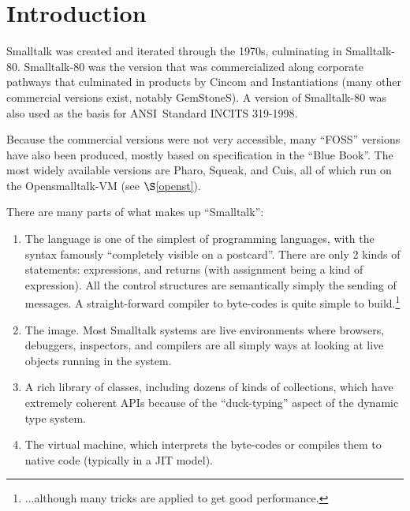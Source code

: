 \documentclass[
]{ceurart}
\def\secref{$\S$\ref}
\begin{document}
\section{Introduction}
Smalltalk was created and iterated through the 1970s\cite{10.1145/3386335}, culminating in Smalltalk-80\cite{Smalltalk-80,10.5555/226}.
Smalltalk-80 was the version that was commercialized along corporate pathways that culminated in products by Cincom\cite{Cincom-smalltalk} and Instantiations\cite{Instantiations-smalltalk} (many other commercial versions exist, notably GemStoneS\cite{Gemtalk-smalltalk}).
A version of Smalltalk-80 was also used as the basis for ANSI~Standard INCITS 319-1998\cite{ANSI-Smalltalk}.

Because the commercial versions were not very accessible, many ``FOSS'' versions have also been produced, mostly based on specification in the ``Blue Book''\cite{Smalltalk-80}.
The most widely available versions are Pharo\cite{Pharo-Smalltalk}, Squeak\cite{Squeak-Smalltalk}, and Cuis\cite{Cuis-Smalltalk}, all of which run on the Opensmalltalk-VM (see \secref{openst}).

There are many parts of what makes up ``Smalltalk'':
\begin{enumerate}
\item The language is one of the simplest of programming languages, with the syntax famously ``completely visible on a postcard''.
  There are only 2 kinds of statements: expressions, and returns (with assignment being a kind of expression).
  All the control structures are semantically simply the sending of messages.
  A straight-forward compiler to byte-codes is quite simple to build.\footnote{...although many tricks are applied to get good performance.}
\item The image.
  Most Smalltalk systems are live environments where browsers, debuggers, inspectors, and compilers are all simply ways at looking at live objects running in the system.
\item A rich library of classes, including dozens of kinds of collections, which have extremely coherent APIs because of the ``duck-typing'' aspect of the dynamic type system.
\item The virtual machine, which interprets the byte-codes or compiles them to native code (typically in a JIT model).
\end{enumerate}
\end{document}

